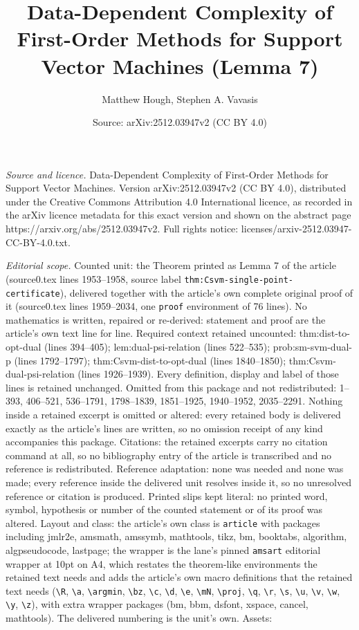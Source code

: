 \documentclass[10pt,a4paper]{amsart}
\title[Data-Dependent Complexity of First-Order Methods for Support]{Data-Dependent Complexity of First-Order Methods for Support Vector Machines (Lemma 7)}
\author{Matthew Hough, Stephen A. Vavasis}
\date{Source: arXiv:2512.03947v2 (CC BY 4.0)}
\begin{document}
\maketitle

\noindent\emph{Source and licence.} Data-Dependent Complexity of First-Order Methods for Support Vector Machines. Version arXiv:2512.03947v2 (CC BY 4.0), distributed under the Creative Commons Attribution 4.0 International licence, as recorded in the arXiv licence metadata for this exact version and shown on the abstract page https://arxiv.org/abs/2512.03947v2. Full rights notice: licenses/arxiv-2512.03947-CC-BY-4.0.txt.\par\smallskip

\noindent\textit{Editorial scope.} Counted unit: the Theorem printed as Lemma 7 of the article (source0.tex lines 1953--1958, source label \texttt{thm:Csvm-single-point-certificate}), delivered together with the article's own complete original proof of it (source0.tex lines 1959--2034, one \texttt{proof} environment of 76 lines). No mathematics is written, repaired or re-derived: statement and proof are the article's own text line for line. Required context retained uncounted: thm:dist-to-opt-dual (lines 394--405); lem:dual-psi-relation (lines 522--535); prob:sm-svm-dual-p (lines 1792--1797); thm:Csvm-dist-to-opt-dual (lines 1840--1850); thm:Csvm-dual-psi-relation (lines 1926--1939). Every definition, display and label of those lines is retained unchanged. Omitted from this package and not redistributed: 1--393, 406--521, 536--1791, 1798--1839, 1851--1925, 1940--1952, 2035--2291. Nothing inside a retained excerpt is omitted or altered: every retained body is delivered exactly as the article's lines are written, so no omission receipt of any kind accompanies this package. Citations: the retained excerpts carry no citation command at all, so no bibliography entry of the article is transcribed and no reference is redistributed. Reference adaptation: none was needed and none was made; every reference inside the delivered unit resolves inside it, so no unresolved reference or citation is produced. Printed slips kept literal: no printed word, symbol, hypothesis or number of the counted statement or of its proof was altered. Layout and class: the article's own class is \texttt{article} with packages including jmlr2e, amsmath, amssymb, mathtools, tikz, bm, booktabs, algorithm, algpseudocode, lastpage; the wrapper is the lane's pinned \texttt{amsart} editorial wrapper at 10pt on A4, which restates the theorem-like environments the retained text needs and adds the article's own macro definitions that the retained text needs (\texttt{\textbackslash R}, \texttt{\textbackslash a}, \texttt{\textbackslash argmin}, \texttt{\textbackslash bz}, \texttt{\textbackslash c}, \texttt{\textbackslash d}, \texttt{\textbackslash e}, \texttt{\textbackslash mN}, \texttt{\textbackslash proj}, \texttt{\textbackslash q}, \texttt{\textbackslash r}, \texttt{\textbackslash s}, \texttt{\textbackslash u}, \texttt{\textbackslash v}, \texttt{\textbackslash w}, \texttt{\textbackslash y}, \texttt{\textbackslash z}), with extra wrapper packages (bm, bbm, dsfont, xspace, cancel, mathtools). The delivered numbering is the unit's own. Assets: 
\end{document}
